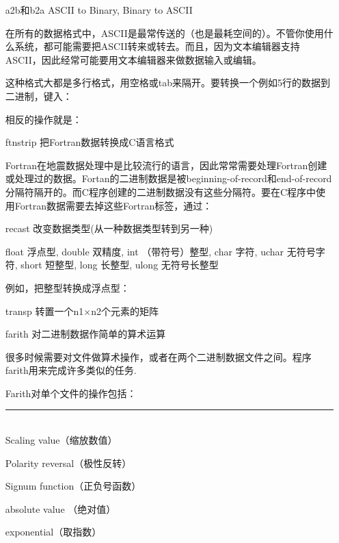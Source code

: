 \begin{enumerate}
	\item[a2b和b2a] ASCII to Binary, Binary to ASCII\par
	在所有的数据格式中，ASCII是最常传送的（也是最耗空间的）。不管你使用什么系统，都可能需要把ASCII转来或转去。而且，因为文本编辑器支持ASCII，因此经常可能要用文本编辑器来做数据输入或编辑。\par
	这种格式大都是多行格式，用空格或tab来隔开。要转换一个例如5行的数据到二进制，键入：\par
	\par
	相反的操作就是：\par
	\par
	\item[ftnstrip] 把Fortran数据转换成C语言格式\par
	Fortran在地震数据处理中是比较流行的语言，因此常常需要处理Fortran创建或处理过的数据。Fortan的二进制数据是被beginning-of-record和end-of-record分隔符隔开的。而C程序创建的二进制数据没有这些分隔符。要在C程序中使用Fortran数据需要去掉这些Fortran标签，通过：\par
	\item[recast] 改变数据类型(从一种数据类型转到另一种)\par
	float 浮点型, double 双精度, int （带符号）整型, char 字符, uchar 无符号字符, short 短整型, long 长整型, ulong 无符号长整型\par
	例如，把整型转换成浮点型：\par
	\item[transp] 转置一个n1×n2个元素的矩阵
	\item[farith] 对二进制数据作简单的算术运算\par
	很多时候需要对文件做算术操作，或者在两个二进制数据文件之间。程序farith用来完成许多类似的任务.\par
    \mvspace
	Farith对单个文件的操作包括：\par
	\rule{0.9\textwidth}{0.1em}\\
	Scaling value（缩放数值）\par
	Polarity reversal（极性反转）\par
	Signum function（正负号函数）\par
	absolute value （绝对值）\par
	exponential（取指数）\par	

\end{enumerate}
